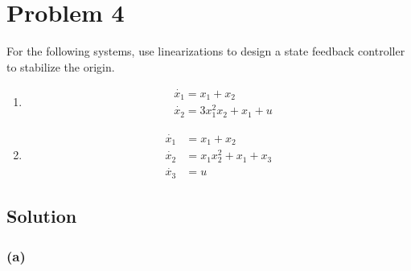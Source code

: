 \section*{Problem 4}

For the following systems, use linearizations to design a state feedback controller to stabilize the origin.
\begin{enumerate}[label= (\alph*), topsep=3pt, itemsep=-1em]
    \item \begin{align*}
               & \dot{x_{1}}=x_{1}+x_{2}               \\
               & \dot{x_{2}}=3 x_{1}^{2} x_{2}+x_{1}+u
          \end{align*}
          \vspace*{-1.5em}

    \item \begin{align*}
              \dot{x_{1}} & =x_{1}+x_{2}                 \\
              \dot{x_{2}} & =x_{1} x_{2}^{2}+x_{1}+x_{3} \\
              \dot{x_{3}} & =u
          \end{align*}
\end{enumerate}
\vspace*{-3em}

\subsection*{Solution}

\subsubsection*{(a)}

